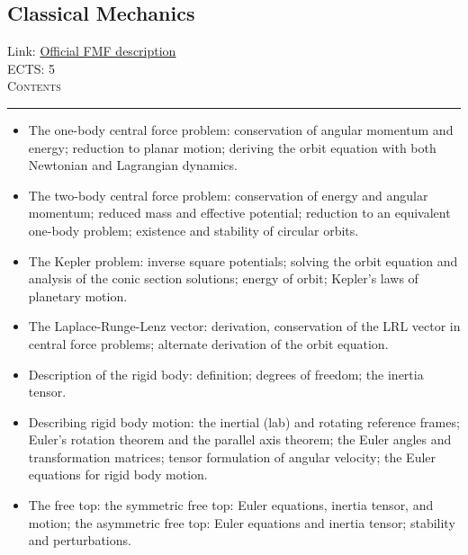 \documentclass[11pt, a4paper]{article}
\newenvironment{course}[3]{
\subsection{#1}%
Link: \href{#2}{Official FMF description}\\%
ECTS: #3%
\vspace{1ex}
\\
{\large \textsc{Contents}}\\[-0.9ex]%
\rule{\textwidth}{0.5pt}
\vspace{-3ex}
}
{}
\newenvironment{chapter}[1]{
\begin{tcolorbox}[title=#1, breakable]
}
{\end{tcolorbox}}
\begin{document}
\begin{course}{Classical Mechanics}{https://www.fmf.uni-lj.si/en/study-physics/programmes/1fiz/2020/7000777/courses/1155/}{5}
\begin{chapter}{Lagrangian mechanics}
\begin{itemize}
        
        \end{itemize}
    \end{chapter}

    \begin{chapter}{Dynamics of central force motion}
        \begin{itemize}
        
            \item The one-body central force problem: conservation of angular momentum and energy; reduction to planar motion; deriving the orbit equation with both Newtonian and Lagrangian dynamics.

            \item The two-body central force problem: conservation of energy and angular momentum; reduced mass and effective potential; reduction to an equivalent one-body problem; existence and stability of circular orbits.

            \item The Kepler problem: inverse square potentials; solving the orbit equation and analysis of the conic section solutions; energy of orbit; Kepler's laws of planetary motion.

            \item The Laplace-Runge-Lenz vector: derivation, conservation of the LRL vector in central force problems; alternate derivation of the orbit equation.
        
        \end{itemize}
    \end{chapter}

    \begin{chapter}{Rigid body dynamics}
        \begin{itemize}
        
            \item Description of the rigid body: definition; degrees of freedom; the inertia tensor.

            \item Describing rigid body motion: the inertial (lab) and rotating reference frames; Euler's rotation theorem and the parallel axis theorem; the Euler angles and transformation matrices; tensor formulation of angular velocity; the Euler equations for rigid body motion.

            \item The free top: the symmetric free top: Euler equations, inertia tensor, and motion; the asymmetric free top: Euler equations and inertia tensor; stability and perturbations.


\end{itemize}
\end{chapter}
\end{course}
\end{document}
